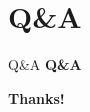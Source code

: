 \documentclass{beamer}
\begin{document}
  \section{Q\&A}
  \begin{frame}{Q\&A}
    \centering
    \textbf{Q\&A}
  \end{frame}

    \begin{frame}
    \centering
    \textbf{Thanks!}
  \end{frame}
\end{document}
